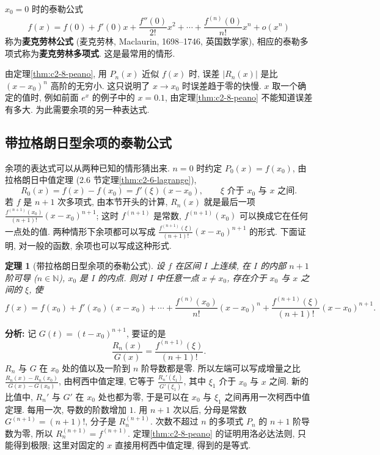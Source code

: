 \documentclass[UTF8,openany]{ctexbook}
\theoremstyle{chinesetextbook}
\newtheorem{theorem}{定理}[section]
\begin{document}
$x_0=0$ 时的泰勒公式
\[
f(x)=f(0)+f'(0)x+\frac{f''(0)}{2!}x^2+\cdots+\frac{f^{(n)}(0)}{n!}x^n+o(x^n)
\]
称为\textbf{麦克劳林公式} (麦克劳林, Maclaurin, 1698--1746, 英国数学家), 相应的泰勒多项式称为\textbf{麦克劳林多项式}. 这是最常用的情形.

由定理\ref{thm:c2-8-peano}, 用 $P_n(x)$ 近似 $f(x)$ 时, 误差 $|R_n(x)|$ 是比 $(x-x_0)^n$ 高阶的无穷小. 这只说明了 $x\to x_0$ 时误差趋于零的快慢. $x$ 取一个确定的值时, 例如前面 $e^x$ 的例子中的 $x=0.1$, 由定理\ref{thm:c2-8-peano} 不能知道误差有多大. 为此需要余项的另一种表达式.
\subsection{带拉格朗日型余项的泰勒公式}
余项的表达式可以从两种已知的情形猜出来. $n=0$ 时约定 $P_0(x)=f(x_0)$, 由拉格朗日中值定理 (2.6 节定理\ref{thm:c2-6-lagrange}),
\[
R_0(x)=f(x)-f(x_0)=f'(\xi)(x-x_0),\qquad\xi\text{ 介于 }x_0\text{ 与 }x\text{ 之间}.
\]
若 $f$ 是 $n+1$ 次多项式, 由本节开头的计算, $R_n(x)$ 就是最后一项 $\displaystyle\frac{f^{(n+1)}(x_0)}{(n+1)!}(x-x_0)^{n+1}$; 这时 $f^{(n+1)}$ 是常数, $f^{(n+1)}(x_0)$ 可以换成它在任何一点处的值. 两种情形下余项都可以写成 $\displaystyle\frac{f^{(n+1)}(\xi)}{(n+1)!}(x-x_0)^{n+1}$ 的形式. 下面证明, 对一般的函数, 余项也可以写成这种形式.
\begin{theorem}[带拉格朗日型余项的泰勒公式]\label{thm:c2-8-lagrange}
设 $f$ 在区间 $I$ 上连续, 在 $I$ 的内部 $n+1$ 阶可导 ($n\in\mathbb N$), $x_0$ 是 $I$ 的内点. 则对 $I$ 中任意一点 $x\ne x_0$, 存在介于 $x_0$ 与 $x$ 之间的 $\xi$, 使
\[
f(x)=f(x_0)+f'(x_0)(x-x_0)+\cdots+\frac{f^{(n)}(x_0)}{n!}(x-x_0)^n+\frac{f^{(n+1)}(\xi)}{(n+1)!}(x-x_0)^{n+1}.
\]
\end{theorem}
\par\indent\textbf{分析:} 记 $G(t)=(t-x_0)^{n+1}$, 要证的是
\[
\frac{R_n(x)}{G(x)}=\frac{f^{(n+1)}(\xi)}{(n+1)!}.
\]
$R_n$ 与 $G$ 在 $x_0$ 处的值以及一阶到 $n$ 阶导数都是零. 所以左端可以写成增量之比 $\displaystyle\frac{R_n(x)-R_n(x_0)}{G(x)-G(x_0)}$, 由柯西中值定理, 它等于 $\displaystyle\frac{R_n'(\xi_1)}{G'(\xi_1)}$, 其中 $\xi_1$ 介于 $x_0$ 与 $x$ 之间. 新的比值中, $R_n'$ 与 $G'$ 在 $x_0$ 处也都为零, 于是可以在 $x_0$ 与 $\xi_1$ 之间再用一次柯西中值定理. 每用一次, 导数的阶数增加 $1$. 用 $n+1$ 次以后, 分母是常数 $G^{(n+1)}=(n+1)!$, 分子是 $R_n^{(n+1)}$. 次数不超过 $n$ 的多项式 $P_n$ 的 $n+1$ 阶导数为零, 所以 $R_n^{(n+1)}=f^{(n+1)}$. 定理\ref{thm:c2-8-peano} 的证明用洛必达法则, 只能得到极限; 这里对固定的 $x$ 直接用柯西中值定理, 得到的是等式.
\end{document}
